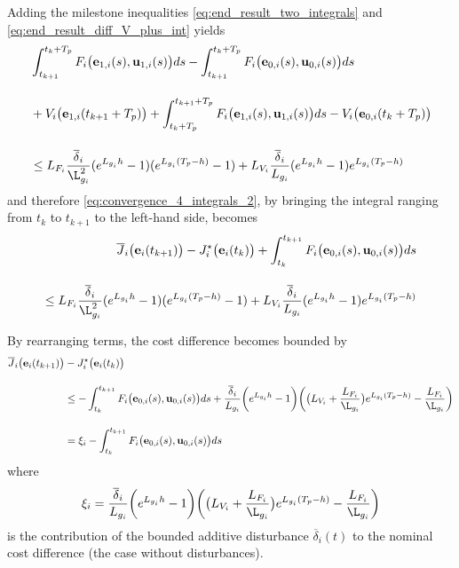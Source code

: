Adding the milestone inequalities \eqref{eq:end_result_two_integrals} and
\eqref{eq:end_result_diff_V_plus_int} yields
\begin{alignat}{2}
  &\int_{t_{k+1}}^{t_k + T_p} F_i \big(\vect{e}_{1,i}(s), \vect{u}_{1,i} (s)\big) d s
  - \int_{t_{k+1}}^{t_k + T_p} F_i \big(\vect{e}_{0,i}(s), \vect{u}_{0,i} (s)\big) d s \\[2.5ex]
  &+ V_i\big(\vect{e}_{1,i}(t_{k+1} + T_p)\big)
  + \int_{t_k + T_p}^{t_{k+1} + T_p} F_i\big(\vect{e}_{1,i}(s), \vect{u}_{1,i}(s)\big) ds
  - V_i\big(\vect{e}_{0,i}(t_k + T_p)\big) \\[2.5ex]
  &\leq L_{F_i} \dfrac{\overline{\delta}_i}{\L_{g_i}^2} (e^{L_{g_i} h} - 1) (e^{L_{g_i}(T_p-h)} - 1)
  + L_{V_i}\dfrac{\overline{\delta}_i}{L_{g_i}} (e^{L_{g_i}h} - 1) e^{L_{g_i} (T_p - h)}
\end{alignat}
and therefore \eqref{eq:convergence_4_integrals_2}, by bringing the integral
ranging from $t_k$ to $t_{k+1}$ to the left-hand side, becomes
\begin{align}
  \overline{J}_i\big(\vect{e}_i(t_{k+1})\big)
    - J_i^{\star}\big(\vect{e}_i(t_k)\big)
    + \int_{t_k}^{t_{k+1}} F_i \big(\vect{e}_{0,i}(s), \vect{u}_{0,i} (s)\big) d s \\[2.5ex]
    \leq L_{F_i} \dfrac{\overline{\delta}_i}{\L_{g_i}^2} (e^{L_{g_i} h} - 1) (e^{L_{g_i}(T_p-h)} - 1)
  + L_{V_i}\dfrac{\overline{\delta}_i}{L_{g_i}} (e^{L_{g_i}h} - 1) e^{L_{g_i} (T_p - h)}
\end{align}

By rearranging terms, the cost difference becomes bounded by
\begin{align}
  \overline{J}_i\big(\vect{e}_i(t_{k+1})\big) &- J_i^{\star}\big(\vect{e}_i(t_k)\big) \\[2.5ex]
  &\leq -\int_{t_k}^{t_{k+1}} F_i \big(\vect{e}_{0,i}(s), \vect{u}_{0,i} (s)\big) d s
    + \dfrac{\overline{\delta}_i}{L_{g_i}} \bigg(e^{L_{g_i}h} - 1\bigg)
    \bigg(\big(L_{V_i} + \dfrac{L_{F_i}}{\L_{g_i}}\big) e^{L_{g_i}(T_p-h)}  - \dfrac{L_{F_i}}{\L_{g_i}}\bigg) \\[2.5ex]
  &= \xi_i -\int_{t_k}^{t_{k+1}} F_i \big(\vect{e}_{0,i}(s), \vect{u}_{0,i} (s)\big) d s
\end{align}
where
\begin{align}
  \xi_i = \dfrac{\overline{\delta}_i}{L_{g_i}} \bigg(e^{L_{g_i}h} - 1\bigg)
    \bigg(\big(L_{V_i} + \dfrac{L_{F_i}}{\L_{g_i}}\big) e^{L_{g_i}(T_p-h)}  - \dfrac{L_{F_i}}{\L_{g_i}}\bigg)
\end{align}
is the contribution of the bounded additive disturbance $\overline{\delta}_i(t)$
to the nominal cost difference (the case without disturbances).

